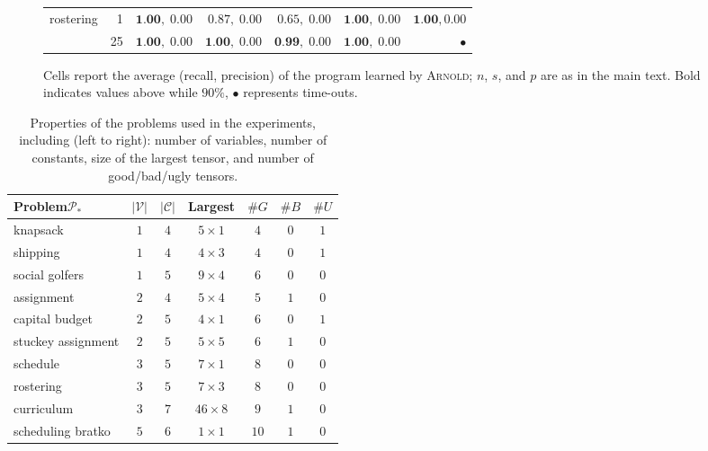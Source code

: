 \documentclass{article}
\newcommand{\learner}{\textsc{Arnold}\xspace}
\newcommand{\variables}{\ensuremath{\mathcal{V}}\xspace}
\newcommand{\constants}{\ensuremath{\mathcal{C}}\xspace}
\newcommand{\program}{\ensuremath{\mathcal{P}}\xspace}
\renewcommand\[{\begin{equation}}
\renewcommand\]{\end{equation}}
\begin{document}
\begin{figure*}
\begin{minipage}{0.70\linewidth}
\begin{small}
\begin{tabular}{l|r|r|rr|rr}
        \midrule
        rostering                       & 1     & $\textbf{1.00},\; 0.00$  & $0.87, \; 0.00$ & $0.65, \; 0.00$  & $\textbf{1.00}, \; 0.00$   & $\textbf{1.00}, 0.00$  \\
                                        & 25    & $\textbf{1.00},\; 0.00$  & $\textbf{1.00}, \; 0.00$ & $\textbf{0.99}, \; 0.00$  & $\textbf{1.00}, \; 0.00$   & $\bullet$     \\
        \bottomrule
    \end{tabular}
    \end{small}
    \caption{\label{tab:results}  Cells report the average (recall, precision)
    of the program learned by \learner; $n$, $s$, and $p$ are as in the main
    text.  Bold indicates values above while $90\%$, $\bullet$ represents time-outs.}
\end{minipage}
\end{figure*}


\begin{table}[tb]
    \begin{center} \begin{small}
        \begin{tabular}{lcccccc}
            \textbf{Problem}\;$\program_*$ & $|\variables|$ & $|\constants|$ & Largest  & $\#G$ & $\#B$ & $\#U$ \\
            \toprule
            knapsack                        & $1$  & $4$ & $5 \times 1$ & $4$ & $0$ & $1$\\
            shipping                        & $1$  & $4$ & $4 \times 3$ & $4$ & $0$ & $1$\\
            social golfers                  & $1$  & $5$ & $9 \times 4$ & $6$ & $0$ & $0$\\
            assignment                      & $2$  & $4$ & $5 \times 4$ & $5$ & $1$ & $0$\\
            capital budget                  & $2$  & $5$ & $4 \times 1$ & $6$ & $0$ & $1$\\
            stuckey assignment              & $2$  & $5$ & $5 \times 5$ & $6$ & $1$ & $0$\\
            schedule                        & $3$  & $5$ & $7 \times 1$ & $8$ & $0$ & $0$\\
            rostering                       & $3$  & $5$ & $7 \times 3$ & $8$ & $0$ & $0$\\
            curriculum                      & $3$  & $7$ & $46 \times 8$ & $9$ & $1$ & $0$\\
            scheduling bratko               & $5$  & $6$ & $1 \times 1$ & $10$ & $1$ & $0$\\
            \bottomrule
        \end{tabular}
    \end{small} \end{center}
    \caption{\label{tab:problems} Properties of the problems used in
    the experiments, including (left to right): number of variables, number of
    constants, size of the largest tensor, and number of good/bad/ugly
    tensors.}
\end{table}
\end{document}

